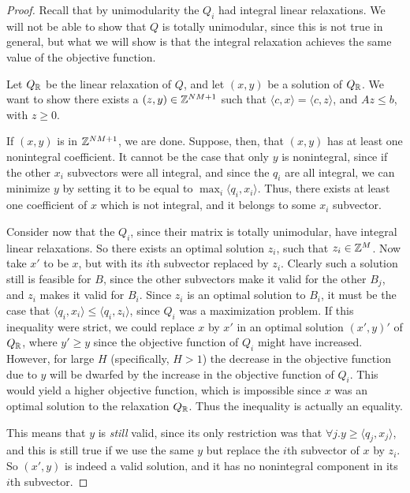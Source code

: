 \begin{proof}
Recall that by unimodularity the $Q_i$ had integral linear relaxations. We will not be able to show that $Q$ is totally unimodular, since this is not true in general, but what we will show is that the integral relaxation achieves the same value of the objective function.

Let $Q_{\mathbb{R}}$ be the linear relaxation of $Q$, and let $(x, y)$ be a solution of $Q_{\mathbb{R}}$. We want to show there exists a $(z, y) \in \mathbb{Z}^{NM+1}$ such that $\langle c, x \rangle = \langle c, z \rangle$, and $Az \le b$, with $z \ge 0$.

If $(x, y)$ is in $\mathbb{Z}^{NM+1}$, we are done. Suppose, then, that $(x, y)$ has at least one nonintegral coefficient. It cannot be the case that only $y$ is nonintegral, since if the other $x_i$ subvectors were all integral, and since the $q_i$ are all integral, we can minimize $y$ by setting it to be equal to $\max_i \langle q_i, x_i \rangle$. Thus, there exists at least one coefficient of $x$ which is not integral, and it belongs to some $x_i$ subvector.

Consider now that the $Q_i$, since their matrix is totally unimodular, have integral linear relaxations. So there exists an optimal solution $z_i$, such that $z_i \in \mathbb{Z}^M$. Now take $x'$ to be $x$, but with its $i$th subvector replaced by $z_i$. Clearly such a solution still is feasible for $B$, since the other subvectors make it valid for the other $B_j$, and $z_i$ makes it valid for $B_i$. Since $z_i$ is an optimal solution to $B_i$, it must be the case that $\langle q_i, x_i \rangle \le \langle q_i, z_i \rangle$, since $Q_i$ was a maximization problem. If this inequality were strict, we could replace $x$ by $x'$ in an optimal solution $(x', y)'$ of $Q_{\mathbb{R}}$, where $y' \ge y$ since the objective function of $Q_i$ might have increased. However, for large $H$ (specifically, $H > 1$) the decrease in the objective function due to $y$ will be dwarfed by the increase in the objective function of $Q_i$. This would yield a higher objective function, which is impossible since $x$ was an optimal solution to the relaxation $Q_{\mathbb{R}}$. Thus the inequality is actually an equality.

This means that $y$ is \emph{still} valid, since its only restriction was that $\forall j. y \ge \langle q_j, x_j \rangle$, and this is still true if we use the same $y$ but replace the $i$th subvector of $x$ by $z_i$. So $(x', y)$ is indeed a valid solution, and it has no nonintegral component in its $i$th subvector.


\end{proof}
